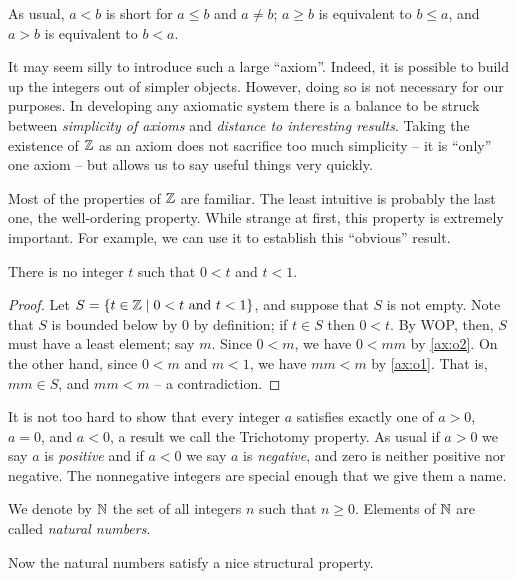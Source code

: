 As usual, \(a < b\) is short for \(a \leq b\) and \(a \neq b\); \(a \geq b\) is equivalent to \(b \leq a\), and \(a > b\) is equivalent to \(b < a\).

It may seem silly to introduce such a large ``axiom''.
Indeed, it is possible to build up the integers out of simpler objects.
However, doing so is not necessary for our purposes.
In developing any axiomatic system there is a balance to be struck between \emph{simplicity of axioms} and \emph{distance to interesting results}.
Taking the existence of \(\mathbb{Z}\) as an axiom does not sacrifice too much simplicity -- it is ``only'' one axiom -- but allows us to say useful things very quickly.

Most of the properties of \(\mathbb{Z}\) are familiar.
The least intuitive is probably the last one, the well-ordering property.
While strange at first, this property is extremely important.
For example, we can use it to establish this ``obvious'' result.

\begin{prop}
There is no integer \(t\) such that \(0 < t\) and \(t < 1\).
\end{prop}

\begin{proof}
Let \(S = \{ t \in \mathbb{Z} \mid 0 < t \ \mathrm{and}\ t < 1 \}\), and suppose that \(S\) is not empty.
Note that \(S\) is bounded below by \(0\) by definition; if \(t \in S\) then \(0 < t\).
By WOP, then, \(S\) must have a least element; say \(m\).
Since \(0 < m\), we have \(0 < mm\) by \ref{ax:o2}.
On the other hand, since \(0 < m\) and \(m < 1\), we have \(mm < m\) by \ref{ax:o1}.
That is, \(mm \in S\), and \(mm < m\) -- a contradiction.
\end{proof}

It is not too hard to show that every integer \(a\) satisfies exactly one of \(a > 0\), \(a = 0\), and \(a < 0\), a result we call the Trichotomy property.
As usual if \(a > 0\) we say \(a\) is \emph{positive} and if \(a < 0\) we say \(a\) is \emph{negative}, and zero is neither positive nor negative.
The nonnegative integers are special enough that we give them a name.

\begin{dfn}
We denote by \(\mathbb{N}\) the set of all integers \(n\) such that \(n \geq 0\).
Elements of \(\mathbb{N}\) are called \emph{natural numbers}.
\end{dfn}

Now the natural numbers satisfy a nice structural property.

